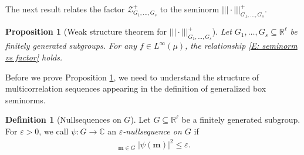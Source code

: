 \documentclass[11pt]{amsart}
\newtheorem{proposition}[lemma]{Proposition}
\theoremstyle{definition}
\newtheorem{definition}[lemma]{Definition}
\DeclareMathOperator*{\oE}{\overline{\mathbb{E}}}
\DeclareMathOperator*{\E}{\mathbb{E}}
\newcommand{\C}{{\mathbb C}}
\newcommand{\R}{{\mathbb R}}
\newcommand{\Z}{{\mathbb Z}}
\newcommand{\CZ}{{\mathcal Z}}
\newcommand{\bm}{{\mathbf{m}}}
\newcommand{\veps}{\varepsilon}
\newcommand{\nnorm}[1]{\lvert\!|\!| #1|\!|\!\rvert}
\newcommand{\1}{{\mathbf{1}}}
\begin{document}


The next result relates the factor $\CZ_{G_1, \ldots, G_s}^+$ to the seminorm $\nnorm{\cdot}_{G_1, \ldots, G_s}^+$.
\begin{proposition}[Weak structure theorem for $\nnorm{\cdot}_{G_1, \ldots, G_s}^+$]\label{P: structure theorem}
    Let $G_1, \ldots, G_s\subseteq\R^\ell$ be finitely generated subgroups. For any $f\in L^\infty(\mu)$, the relationship \eqref{E: seminorm vs factor} holds.
\end{proposition}

Before we prove Proposition \ref{P: structure theorem}, we need to understand the structure of multicorrelation sequences appearing in the definition of generalized box seminorms.

\begin{definition}[Nullsequences on $G$]
    Let $G\subseteq\R^\ell$ be a finitely generated subgroup. For $\veps>0$, we call $\psi: G\to\C$ an \textit{$\veps$-nullsequence on $G$} if
    \begin{align*}
        \oE_{\bm\in G}|\psi(\bm)|^2\leq \veps.
    \end{align*}
\end{definition}
\end{document}
